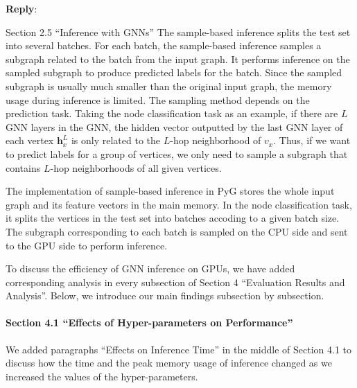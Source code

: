 \documentclass[12pt]{article}
\newcommand{\MyVec}[1]{\boldsymbol{#1}}
\newenvironment{myquote}[1]%
{\vspace{0.5em}\begin{zitat}{#1}}
{\end{zitat}\vspace{0.5em}}
\newenvironment{reply}
   {\medskip \noindent \textbf{Reply}:\  }
   {\medskip}
\begin{document}
\begin{reply}
\begin{myquote}{Section 2.5 ``Inference with GNNs''}
    The sample-based inference splits the test set into several batches.
    For each batch, the sample-based inference samples a subgraph related to the batch from the input graph.
    It performs inference on the sampled subgraph to produce predicted labels for the batch.
    Since the sampled subgraph is usually much smaller than the original input graph, the memory usage during inference is limited.
    The sampling method depends on the prediction task.
    Taking the node classification task as an example, if there are $L$ GNN layers in the GNN, the hidden vector outputted by the last GNN layer of each vertex $\MyVec{h}^L_x$ is only related to the $L$-hop neighborhood of $v_x$.
    Thus, if we want to predict labels for a group of vertices, we only need to sample a subgraph that contains $L$-hop neighborhoods of all given vertices.
    
    The implementation of sample-based inference in PyG stores the whole input graph and its feature vectors in the main memory.
    In the node classification task, it splits the vertices in the test set into batches accoding to a given batch size.
    The subgraph corresponding to each batch is sampled on the CPU side and sent to the GPU side to perform inference.
    
    \end{myquote}
    
    
    
    
    To discuss the efficiency of GNN inference on GPUs, we have added corresponding analysis in every subsection of Section 4 ``Evaluation Results and Analysis''.
    Below, we introduce our main findings subsection by subsection.
   
    \paragraph{Section 4.1 ``Effects of Hyper-parameters on Performance''}

    We added paragraphs ``Effects on Inference Time'' in the middle of Section 4.1 to discuss how the time and the peak memory usage of inference changed as we increased the values of the hyper-parameters.
    

\end{reply}
\end{document}
